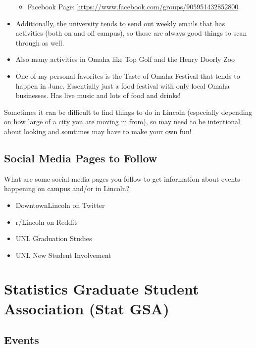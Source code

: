 \documentclass[
  12pt,
]{book}
\providecommand{\tightlist}{%
  \setlength{\itemsep}{0pt}\setlength{\parskip}{0pt}}
\begin{document}
\begin{itemize}
  \begin{itemize}
  \tightlist
  \item
    Facebook Page: \url{https://www.facebook.com/groups/905951432852800}
  \end{itemize}
\item
  Additionally, the university tends to send out weekly emails that has activities (both on and off campus), so those are always good things to scan through as well.
\item
  Also many activities in Omaha like Top Golf and the Henry Doorly Zoo
\item
  One of my personal favorites is the Taste of Omaha Festival that tends to happen in June. Essentially just a food festival with only local Omaha businesses. Has live music and lots of food and drinks!
\end{itemize}

Sometimes it can be difficult to find things to do in Lincoln (especially depending on how large of a city you are moving in from), so may need to be intentional about looking and somtimes may have to make your own fun!

\hypertarget{social-media-pages-to-follow}{%
\section{Social Media Pages to Follow}\label{social-media-pages-to-follow}}

What are some social media pages you follow to get information about events happening on campus and/or in Lincoln?

\begin{itemize}
\tightlist
\item
  DowntownLincoln on Twitter
\item
  r/Lincoln on Reddit
\item
  UNL Graduation Studies
\item
  UNL New Student Involvement
\end{itemize}

\hypertarget{statGSA}{%
\chapter{Statistics Graduate Student Association (Stat GSA)}\label{statGSA}}

\hypertarget{events}{%
\section{Events}\label{events}}
\end{document}
